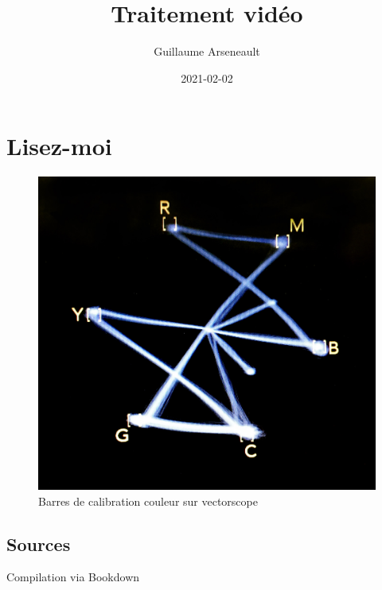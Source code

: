 \documentclass[
]{book}
\title{Traitement vidéo}
\author{Guillaume Arseneault}
\date{2021-02-02}
\begin{document}
\maketitle

{
\setcounter{tocdepth}{1}
\tableofcontents
}
\hypertarget{lisez-moi}{%
\chapter*{Lisez-moi}\label{lisez-moi}}

\begin{figure}
\centering
\includegraphics{images/vectorscope.jpg}
\caption{\label{fig:unnamed-chunk-1}Barres de calibration couleur sur vectorscope \citep{marsh_ColorBarsVectorscope_2016}}
\end{figure}

\hypertarget{sources}{%
\section*{Sources}\label{sources}}

Compilation via Bookdown \citep{xie_BookdownAuthoringBooks_2020}
\end{document}
